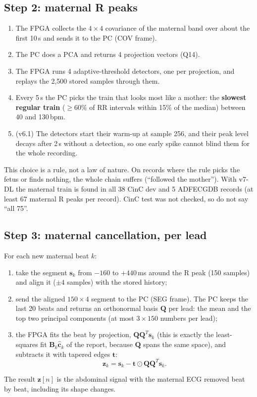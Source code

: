 \documentclass[11pt]{article}
\begin{document}
\subsection{Step 2: maternal R peaks}
\begin{enumerate}
  \item The FPGA collects the $4\times4$ covariance of the maternal band over about the first 10\,s and sends it to the PC (COV frame).
  \item The PC does a PCA and returns 4 projection vectors (Q14).
  \item The FPGA runs 4 adaptive-threshold detectors, one per projection, and replays the 2,500 stored samples through them.
  \item Every 5\,s the PC picks the train that looks most like a mother: the \textbf{slowest regular train} ($\ge 60\%$ of RR intervals within 15\% of the median) between 40 and 130\,bpm.
  \item (v6.1) The detectors start their warm-up at sample 256, and their peak level decays after 2\,s without a detection, so one early spike cannot blind them for the whole recording.
\end{enumerate}

\begin{warn}
This choice is a rule, not a law of nature. On records where the rule picks the fetus or finds nothing, the whole chain suffers (``followed the mother''). With v7-DL the maternal train is found in all 38 CinC dev and 5 ADFECGDB records (at least 67 maternal R peaks per record). CinC test was not checked, so do not say ``all 75''.
\end{warn}

\subsection{Step 3: maternal cancellation, per lead}
For each new maternal beat $k$:
\begin{enumerate}
  \item take the segment $\mathbf{s}_k$ from $-160$ to $+440$\,ms around the R peak (150 samples) and align it ($\pm4$ samples) with the stored history;
  \item send the aligned $150\times4$ segment to the PC (SEG frame). The PC keeps the last 20 beats and returns an orthonormal basis $\mathbf{Q}$ per lead: the mean and the top two principal components (at most $3\times150$ numbers per lead);
  \item the FPGA fits the beat by projection, $\mathbf{Q}\mathbf{Q}^T\mathbf{s}_k$ (this is exactly the least-squares fit $\mathbf{B}_k\hat{\mathbf{c}}_k$ of the report, because $\mathbf{Q}$ spans the same space), and subtracts it with tapered edges $\mathbf{t}$:
  \[
  \mathbf{z}_k = \mathbf{s}_k - \mathbf{t}\odot\mathbf{Q}\mathbf{Q}^T\mathbf{s}_k .
  \]
\end{enumerate}
The result $\mathbf{z}[n]$ is the abdominal signal with the maternal ECG removed beat by beat, including its shape changes.
\end{document}
